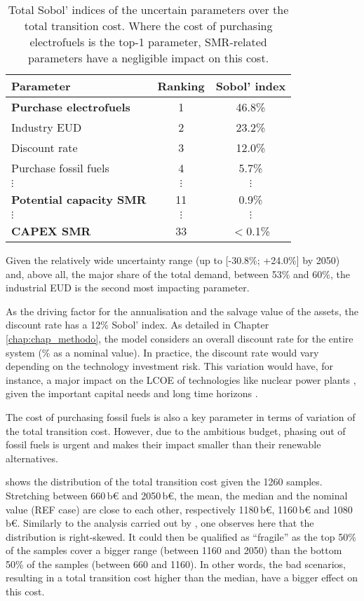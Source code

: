 \begin{table}[htbp!]
\caption{Total Sobol' indices of the uncertain parameters over the total transition cost. Where the cost of purchasing electrofuels is the top-1 parameter, \gls{SMR}-related parameters have a negligible impact on this cost.}
\label{tab:UQ_short}
\centering
\begin{tabular}{l c c}
\toprule
\textbf{Parameter}  & \textbf{Ranking} & \textbf{Sobol' index} \\	
\midrule
\textbf{Purchase electrofuels} & 1 & 46.8\% \\
Industry EUD & 2 & 23.2\% \\
Discount rate & 3 & 12.0\% \\
Purchase fossil fuels  & 4 & 5.7\% \\
$\vdots$ & $\vdots$ & $\vdots$\\
\textbf{Potential capacity \gls{SMR}} & 11 & 0.9\% \\
$\vdots$ & $\vdots$ & $\vdots$\\
\textbf{CAPEX \gls{SMR}} & 33 & $<$0.1\% \\
\bottomrule							

\end{tabular}
\end{table}

Given the relatively wide uncertainty range (\ie up to [-30.8\%; +24.0\%] by 2050) and, above all, the major share of the total demand, between 53\% and 60\%, the industrial \gls{EUD} is the second most impacting parameter. 

As the driving factor for the annualisation and the salvage value of the assets, the discount rate has a 12\% Sobol' index. As detailed in Chapter \ref{chap:chap_methodo}, the model considers an overall discount rate for the entire system (\% as a nominal value). In practice, the discount rate would vary depending on the technology investment risk. This variation would have, for instance, a major impact on the \gls{LCOE} of technologies like nuclear power plants \cite{world_nuclear_asso}, given the important capital needs and long time horizons \cite{IEA_Nuclear_2022}.

The cost of purchasing fossil fuels is also a key parameter in terms of variation of the total transition cost. However, due to the ambitious  budget, phasing out of fossil fuels is urgent and makes their impact smaller than their renewable alternatives.

 shows the distribution of the total transition cost given the 1260 samples. Stretching between 660\,b€ and 2050\,b€, the mean, the median and the nominal value (\ie REF case) are close to each other, respectively 1180\,b€, 1160\,b€ and 1080\,b€. Similarly to the analysis carried out by \citet{coppitters2023optimizing}, one observes here that the distribution is right-skewed. It could then be qualified as ``fragile'' as the top 50\% of the samples cover a bigger range (\ie between 1160 and 2050) than the bottom 50\% of the samples (\ie between 660 and 1160). In other words, the bad scenarios, resulting in a total transition cost higher than the median, have a bigger effect on this cost.

